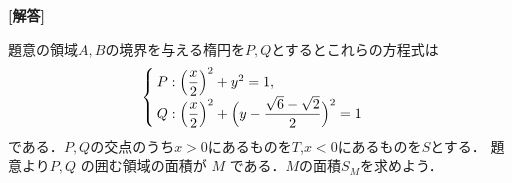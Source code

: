 \documentclass[../../main.tex]{subfiles}
\begin{document}
\begin{oframed}
  
\end{oframed}

{\bf [解答]}

題意の領域$A,B$の境界を与える楕円を$P,Q$とするとこれらの方程式は
\begin{align}
  \begin{cases}
    P: \Bigl(\dfrac{x}{2}\Bigr)^2 + y^2 = 1, \\
    Q: \Bigl(\dfrac{x}{2}\Bigr)^2 + \Bigl(y - \dfrac{\sqrt{6}-\sqrt{2}}{2}\Bigr)^2 = 1
  \end{cases}
\end{align}
である．$P,Q$の交点のうち$x>0$にあるものを$T$,$x<0$にあるものを$S$とする．
題意より$P, Q$ の囲む領域の面積が $M$ である．$M$の面積$S_M$を求めよう．
\end{document}
